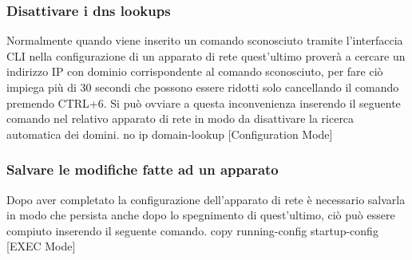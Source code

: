 \subsubsection{Disattivare i dns lookups}
Normalmente quando viene inserito un comando sconosciuto tramite l'interfaccia CLI nella configurazione di un apparato di rete quest'ultimo proverà a cercare un indirizzo IP con dominio corrispondente al comando sconosciuto, per fare ciò impiega più di 30 secondi che possono essere ridotti solo cancellando il comando premendo CTRL+6. Si può ovviare a questa inconvenienza inserendo il seguente comando nel relativo apparato di rete in modo da disattivare la ricerca automatica dei domini. 
\newline
\smallskip
\newline
no ip domain-lookup [Configuration Mode]

\subsubsection{Salvare le modifiche fatte ad un apparato}
Dopo aver completato la configurazione dell'apparato di rete è necessario salvarla in modo che persista anche dopo lo spegnimento di quest'ultimo, ciò può essere compiuto inserendo il seguente comando.  
\newline
\smallskip
\newline
copy running-config startup-config [EXEC Mode]